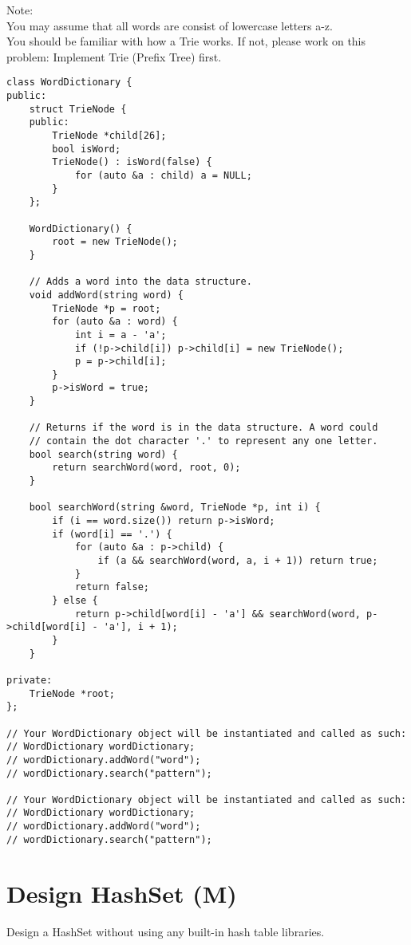 Note:\\
You may assume that all words are consist of lowercase letters a-z.\\
You should be familiar with how a Trie works. If not, please work on this problem: Implement Trie (Prefix Tree) first. \\

\begin{lstlisting}
class WordDictionary {
public:
    struct TrieNode {
    public:
        TrieNode *child[26];
        bool isWord;
        TrieNode() : isWord(false) {
            for (auto &a : child) a = NULL;
        }
    };
    
    WordDictionary() {
        root = new TrieNode();
    }
    
    // Adds a word into the data structure.
    void addWord(string word) {
        TrieNode *p = root;
        for (auto &a : word) {
            int i = a - 'a';
            if (!p->child[i]) p->child[i] = new TrieNode();
            p = p->child[i];
        }
        p->isWord = true;
    }

    // Returns if the word is in the data structure. A word could
    // contain the dot character '.' to represent any one letter.
    bool search(string word) {
        return searchWord(word, root, 0);
    }
    
    bool searchWord(string &word, TrieNode *p, int i) {
        if (i == word.size()) return p->isWord;
        if (word[i] == '.') {
            for (auto &a : p->child) {
                if (a && searchWord(word, a, i + 1)) return true;
            }
            return false;
        } else {
            return p->child[word[i] - 'a'] && searchWord(word, p->child[word[i] - 'a'], i + 1);
        }
    }
    
private:
    TrieNode *root;
};

// Your WordDictionary object will be instantiated and called as such:
// WordDictionary wordDictionary;
// wordDictionary.addWord("word");
// wordDictionary.search("pattern");

// Your WordDictionary object will be instantiated and called as such:
// WordDictionary wordDictionary;
// wordDictionary.addWord("word");
// wordDictionary.search("pattern");
\end{lstlisting}

\section{Design HashSet (M)}
Design a HashSet without using any built-in hash table libraries.\\

